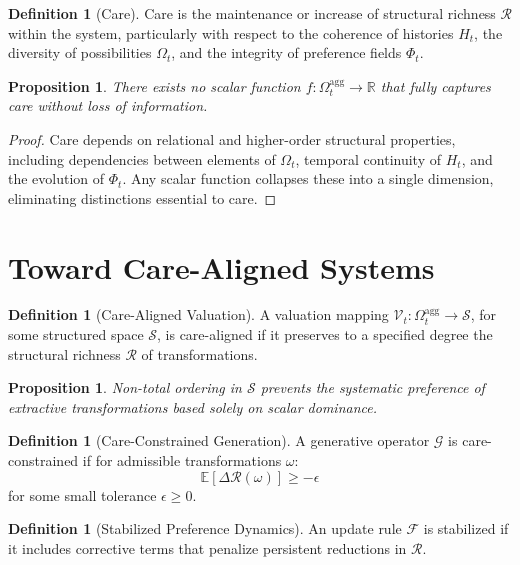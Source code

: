 \documentclass[11pt,a4paper]{article}
\newtheorem{proposition}[theorem]{Proposition}
\theoremstyle{definition}
\newtheorem{definition}[theorem]{Definition}
\theoremstyle{remark}
\begin{document}
\begin{definition}[Care]
Care is the maintenance or increase of structural richness $\mathcal{R}$ within the system, particularly with respect to the coherence of histories $H_t$, the diversity of possibilities $\Omega_t$, and the integrity of preference fields $\Phi_t$.
\end{definition}

\begin{proposition}
There exists no scalar function $f : \Omega_t^{\mathrm{agg}} \rightarrow \mathbb{R}$ that fully captures care without loss of information.
\end{proposition}

\begin{proof}
Care depends on relational and higher-order structural properties, including dependencies between elements of $\Omega_t$, temporal continuity of $H_t$, and the evolution of $\Phi_t$. Any scalar function collapses these into a single dimension, eliminating distinctions essential to care.
\end{proof}

\section{Toward Care-Aligned Systems}

\begin{definition}[Care-Aligned Valuation]
A valuation mapping $\mathcal{V}_t : \Omega_t^{\mathrm{agg}} \rightarrow \mathcal{S}$, for some structured space $\mathcal{S}$, is care-aligned if it preserves to a specified degree the structural richness $\mathcal{R}$ of transformations.
\end{definition}

\begin{proposition}
Non-total ordering in $\mathcal{S}$ prevents the systematic preference of extractive transformations based solely on scalar dominance.
\end{proposition}

\begin{definition}[Care-Constrained Generation]
A generative operator $\mathcal{G}$ is care-constrained if for admissible transformations $\omega$:
\[
\mathbb{E}[\Delta \mathcal{R}(\omega)] \geq -\epsilon
\]
for some small tolerance $\epsilon \geq 0$.
\end{definition}

\begin{definition}[Stabilized Preference Dynamics]
An update rule $\mathcal{F}$ is stabilized if it includes corrective terms that penalize persistent reductions in $\mathcal{R}$.
\end{definition}
\end{document}
